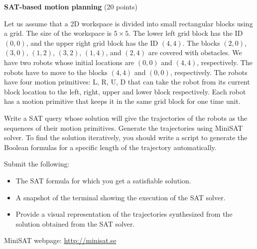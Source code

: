 \documentclass[a4paper, 12pt]{article}
\begin{document}
\begin{problem}{\textbf{SAT-based motion planning}} (20 points)

\bigskip

Let us assume that a 2D workspace
is divided into small rectangular blocks using a grid. The size of the workspace is $5 \times 5$. The lower left grid block has the ID $(0,0)$, and 
the upper right grid block has the ID $(4,4)$. The blocks $(2,0)$, $(3,0)$, $(1,2)$, $(3,2)$, $(1,4)$, and $(2,4)$ are covered with obstacles. 
We have two robots whose initial locations are $(0,0)$ and $(4,4)$, respectively. The robots have to move to the blocks $(4,4)$ and $(0,0)$, respectively.
The robots have four motion primitives: L, R, U, D that can take the robot from its current block location to the left, right, upper and lower block respectively.  
Each robot has a motion primitive that keeps it in the same grid block for one time unit. 


Write a SAT query whose solution will give the trajectories of the robots as the sequences of their motion primitives.
Generate the trajectories using MiniSAT solver. To find the solution iteratively, you should write a script to generate the Boolean formulas for a specific length 
of the trajectory automatically.


\bigskip
\noindent
Submit the following:
\begin{itemize}
\item The SAT formula for which you get a satisfiable solution.
\item A snapshot of the terminal showing the execution of the SAT solver.
\item Provide a visual representation of the trajectories synthesized from the solution obtained from the SAT solver.
\end{itemize}

\bigskip
\noindent
MiniSAT webpage:
\url{http://minisat.se}


\end{problem}
\end{document}
